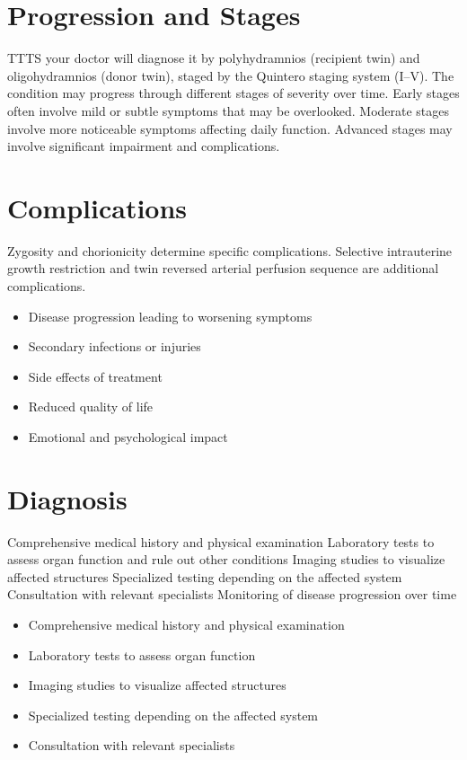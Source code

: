 \section{Progression and Stages}
TTTS your doctor will diagnose it by polyhydramnios (recipient twin) and oligohydramnios (donor twin), staged by the Quintero staging system (I--V). The condition may progress through different stages of severity over time. Early stages often involve mild or subtle symptoms that may be overlooked. Moderate stages involve more noticeable symptoms affecting daily function. Advanced stages may involve significant impairment and complications.
\section{Complications}
Zygosity and chorionicity determine specific complications. Selective intrauterine growth restriction and twin reversed arterial perfusion sequence are additional complications.

\begin{itemize}[noitemsep]
  \item Disease progression leading to worsening symptoms
  \item Secondary infections or injuries
  \item Side effects of treatment
  \item Reduced quality of life
  \item Emotional and psychological impact
\end{itemize}
\section{Diagnosis}
Comprehensive medical history and physical examination Laboratory tests to assess organ function and rule out other conditions Imaging studies to visualize affected structures Specialized testing depending on the affected system Consultation with relevant specialists Monitoring of disease progression over time

\begin{itemize}[noitemsep]
  \item Comprehensive medical history and physical examination
  \item Laboratory tests to assess organ function
  \item Imaging studies to visualize affected structures
  \item Specialized testing depending on the affected system
  \item Consultation with relevant specialists
\end{itemize}
